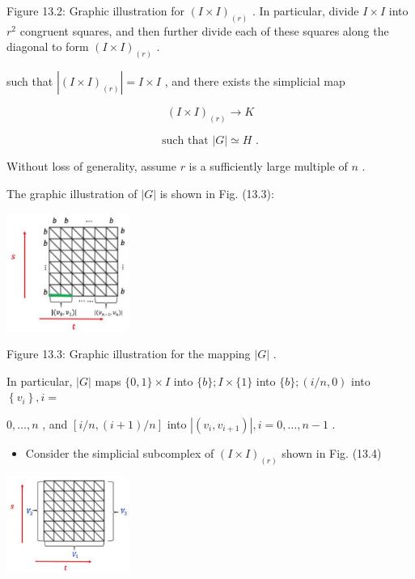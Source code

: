 Figure 13.2: Graphic illustration for \({\left( I \times  I\right) }_{\left( r\right) }\) . In particular, divide \(I \times  I\) into \({r}^{2}\) congruent squares, and then further divide each of these squares along the diagonal to form \({\left( I \times  I\right) }_{\left( r\right) }\) .

such that \(\left| {\left( I \times  I\right) }_{\left( r\right) }\right|  = I \times  I\) , and there exists the simplicial map

\[
{\left( I \times  I\right) }_{\left( r\right) } \rightarrow  K
\]

\[
\text{ such that }\left| G\right|  \simeq  H\text{ . }
\]

Without loss of generality, assume \(r\) is a sufficiently large multiple of \(n\) .

The graphic illustration of \(\left| G\right|\) is shown in Fig. (13.3):

\begin{center}
\includegraphics[max width=0.3\textwidth]{images/bo_d2bcsrref24c73avs720_132_594_1549_371_359_0.jpg}
\end{center}
\hspace*{3em} 

Figure 13.3: Graphic illustration for the mapping \(\left| G\right|\) .

In particular, \(\left| G\right|\) maps \(\{ 0,1\}  \times  I\) into \(\{ b\} ;I \times  \{ 1\}\) into \(\{ b\} ;\left( {i/n,0}\right)\) into \(\left\{  {v}_{i}\right\}  ,i =\)

\(0,\ldots ,n\) , and \(\left\lbrack  {i/n,\left( {i + 1}\right) /n}\right\rbrack\) into \(\left| \left( {{v}_{i},{v}_{i + 1}}\right) \right| ,i = 0,\ldots ,n - 1\) .

\begin{itemize}
\item Consider the simplicial subcomplex of \({\left( I \times  I\right) }_{\left( r\right) }\) shown in Fig. (13.4)
\end{itemize}

\begin{center}
\includegraphics[max width=0.3\textwidth]{images/bo_d2bcsrref24c73avs720_133_744_505_440_343_0.jpg}
\end{center}
\hspace*{3em} 

